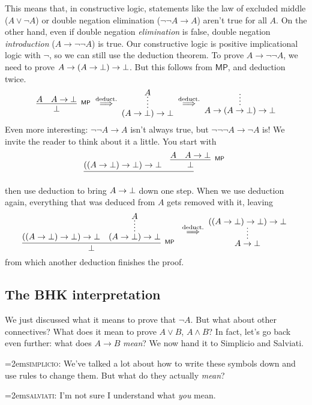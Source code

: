 \documentclass[11pt,paper=letter]{scrartcl}
\newcommand{\sf}{\mathsf}
\renewcommand{\land}{\wedge}
\renewcommand{\lor}{\vee}
\renewcommand{\lnot}{\neg}
\newcommand{\vc}[1]{\vcenter{\hbox{#1}}}
\newcommand{\simp}{\vspace{0.5em}\noindent\hangindent=2em\textsc{simplicio:} }
\newcommand{\salv}{\vspace{0.5em}\noindent\hangindent=2em\textsc{salviati:} }
\begin{document}
This means that, in constructive logic, statements like the law of excluded middle ($A \lor \lnot A$) or double negation elimination ($\lnot \lnot A \to A$) aren't true for all $A$. On the other hand, even if double negation \emph{elimination} is false, double negation \emph{introduction} ($A \to \lnot\lnot A$) is true. Our constructive logic is positive implicational logic with $\lnot$, so we can still use the deduction theorem. To prove $A \to \lnot\lnot A$, we need to prove $A \to (A \to \bot) \to \bot$. But this follows from $\sf{MP}$, and deduction twice.
\begin{align*}
\vc{\infer[^\sf{MP}]
{\false}
{A & A \to \false}}
\;\overset{\text{deduct.}}{\implies}\;
\vc{\infer*
{(A \to \false) \to \false}
{A}}
\;\overset{\text{deduct.}}{\implies}\;
\vc{\infer*
{A \to (A \to \false) \to \false}
{}}
\end{align*}
Even more interesting: $\lnot\lnot A \to A$ isn't always true, but $\lnot\lnot\lnot A \to \lnot A$ is! We invite the reader to think about it a little. You start with
\begin{align*}
\vc{\infer
{\phantom{\false}}
{
((A \to \false) \to \false) \to \false
&
\infer[^\sf{MP}]
{\false}
{A & A \to \false}
}
}
\end{align*}
then use deduction to bring $A \to \bot$ down one step. When we use deduction again, everything that was deduced from $A$ gets removed with it, leaving
\begin{align*}
\vc{\infer[^\sf{MP}]
{\false}
{
((A \to \false) \to \false) \to \false
&
\infer*
{(A \to \false) \to \false}
{A}
}
}
\;\overset{\text{deduct.}}{\implies}\;
\vc{\infer*
{A \to \false}
{
((A \to \false) \to \false) \to \false
}
}
\end{align*}
from which another deduction finishes the proof.

\subsection{The BHK interpretation}

We just discussed what it means to prove that $\lnot A$. But what about other connectives? What does it mean to prove $A \lor B$, $A \land B$? In fact, let's go back even further: what does $A \to B$ \emph{mean}? We now hand it to Simplicio and Salviati.

\simp We've talked a lot about how to write these symbols down and use rules to change them. But what do they actually \emph{mean}?

\salv I'm not sure I understand what \emph{you} mean.
\end{document}
